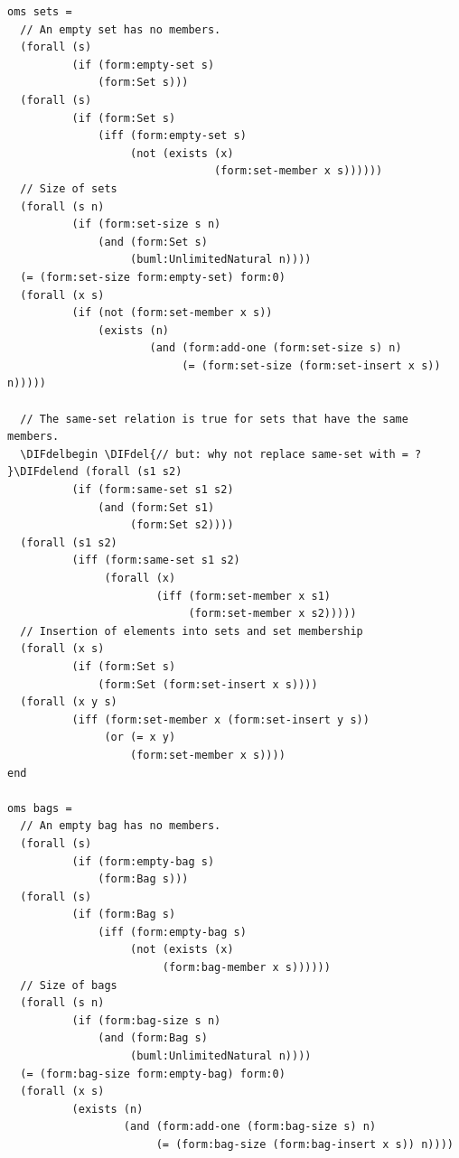 \documentclass[10pt,fleqn,final]{scrreprt}
\newenvironment{definitions}[0]{\medskip }{}
\providecommand{\DIFdel}[1]{{\protect\color{red}\sout{#1}}}                      %
\providecommand{\DIFdelbegin}{} %
\providecommand{\DIFdelend}{} %
\begin{document}
\begin{definitions}
\begin{lstlisting}
oms sets =
  // An empty set has no members.
  (forall (s)
          (if (form:empty-set s)
              (form:Set s)))
  (forall (s)
          (if (form:Set s)
              (iff (form:empty-set s)
                   (not (exists (x)
                                (form:set-member x s))))))
  // Size of sets
  (forall (s n)
          (if (form:set-size s n)
              (and (form:Set s)
                   (buml:UnlimitedNatural n))))
  (= (form:set-size form:empty-set) form:0)
  (forall (x s)
          (if (not (form:set-member x s))
              (exists (n)
                      (and (form:add-one (form:set-size s) n)
                           (= (form:set-size (form:set-insert x s)) n)))))

  // The same-set relation is true for sets that have the same members.
  \DIFdelbegin \DIFdel{// but: why not replace same-set with = ?
}\DIFdelend (forall (s1 s2)
          (if (form:same-set s1 s2)
              (and (form:Set s1)
                   (form:Set s2))))
  (forall (s1 s2)
          (iff (form:same-set s1 s2)
               (forall (x)
                       (iff (form:set-member x s1)
                            (form:set-member x s2)))))
  // Insertion of elements into sets and set membership
  (forall (x s)
          (if (form:Set s)
              (form:Set (form:set-insert x s))))
  (forall (x y s)
          (iff (form:set-member x (form:set-insert y s))
               (or (= x y)
                   (form:set-member x s))))
end

oms bags =
  // An empty bag has no members.
  (forall (s)
          (if (form:empty-bag s)
              (form:Bag s)))
  (forall (s)
          (if (form:Bag s)
              (iff (form:empty-bag s)
                   (not (exists (x)
                        (form:bag-member x s))))))
  // Size of bags
  (forall (s n)
          (if (form:bag-size s n)
              (and (form:Bag s)
                   (buml:UnlimitedNatural n))))
  (= (form:bag-size form:empty-bag) form:0)
  (forall (x s)
          (exists (n)
                  (and (form:add-one (form:bag-size s) n)
                       (= (form:bag-size (form:bag-insert x s)) n))))


\end{lstlisting}
\end{definitions}
\end{document}
